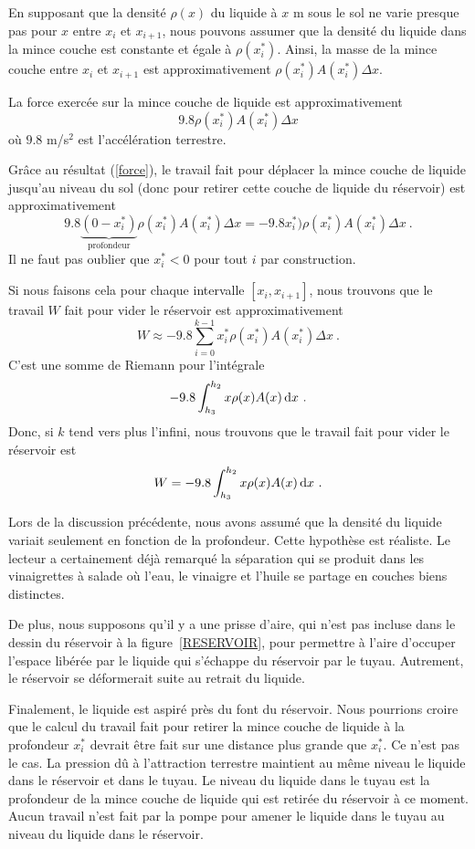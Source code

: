 {En supposant que la densité $\rho(x)$ du liquide à $x$ m sous le sol ne varie
presque pas pour $x$ entre $x_i$ et $x_{i+1}$, nous pouvons assumer
que la densité du liquide dans la mince couche est constante et égale
à $\rho(x_i^\ast)$.  Ainsi, la masse de la mince couche entre $x_i$ et
$x_{i+1}$ est approximativement $\rho(x_i^\ast) A(x_i^\ast) \Delta x$.

La force exercée sur la mince couche de liquide est approximativement
\[
9.8 \rho(x_i^\ast) A(x_i^\ast) \Delta x
\]
où $9.8$ m/s$^2$ est l'accélération terrestre.

Grâce au résultat (\ref{force}), le travail fait pour déplacer la mince
couche de liquide jusqu'au niveau du sol (donc pour retirer cette couche de
liquide du réservoir) est approximativement
\[
9.8 \underbrace{(0-x_i^\ast)}_{\text{profondeur}}
\rho(x_i^\ast) A(x_i^\ast) \Delta x
= - 9.8 x_i^\ast) \rho(x_i^\ast) A(x_i^\ast) \Delta x \ .
\]
Il ne faut pas oublier que $x_i^\ast <0$ pour tout $i$ par construction.

Si nous faisons cela pour chaque intervalle $[x_i,x_{i+1}]$, nous
trouvons que le travail $W$ fait pour vider le réservoir est approximativement
\[
W \approx -9.8 \sum_{i=0}^{k-1} x_i^\ast \rho(x_i^\ast) A(x_i^\ast)
\Delta x \ .
\]
C'est une somme de Riemann pour l'intégrale
\[
-9.8 \int_{h_3}^{h_2} x \rho(x) A(x) \,\mathrm{d}x \ .
\]
Donc, si $k$ tend vers plus l'infini, nous trouvons que le travail fait pour
vider le réservoir est
\begin{equation}\label{travail}
W = -9.8 \int_{h_3}^{h_2} x \rho(x) A(x) \,\mathrm{d}x \ .
\end{equation}

\begin{rmk}
Lors de la discussion précédente, nous avons assumé que la densité du liquide
variait seulement en fonction de la profondeur.  Cette hypothèse est
réaliste.  Le lecteur a certainement déjà remarqué la séparation qui se
produit dans les vinaigrettes à salade où l'eau, le vinaigre et l'huile se
partage en couches biens distinctes.

De plus, nous supposons qu'il y a une prisse d'aire, qui n'est pas incluse
dans le dessin du réservoir à la figure~\ref{RESERVOIR}, pour permettre à
l'aire d'occuper l'espace libérée par le liquide qui s'échappe du
réservoir par le tuyau.  Autrement, le réservoir se déformerait suite
au retrait du liquide.

Finalement, le liquide est aspiré près du font du réservoir.  Nous
pourrions croire que le calcul du travail fait pour retirer la mince
couche de liquide
à la profondeur $x_i^\ast$ devrait être fait sur une distance plus grande que
$x_i^\ast$.  Ce n'est pas le cas.  La pression dû à l'attraction terrestre
maintient au même niveau le liquide dans le réservoir et dans le tuyau.
Le niveau du liquide dans le tuyau est la profondeur de la mince
couche de liquide qui est retirée du réservoir à ce moment.  Aucun
travail n'est fait par la pompe pour amener le liquide dans le tuyau
au niveau du liquide dans le réservoir.
\end{rmk}

}
